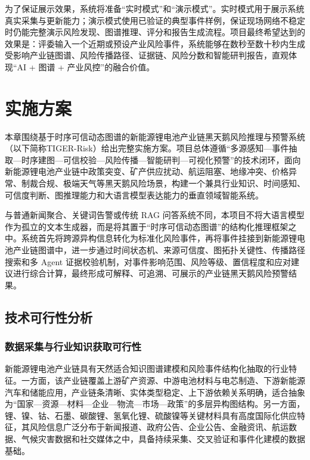 ﻿\documentclass[12pt,a4paper]{article}
\newcommand{\projectname}{基于时序可信动态图谱的新能源锂电池产业链黑天鹅风险推理与预警系统}
\newcommand{\projectshort}{TIGER-Risk}
\begin{document}
为了保证展示效果，系统将准备“实时模式”和“演示模式”。实时模式用于展示系统真实采集与更新能力；演示模式使用已验证的典型事件样例，保证现场网络不稳定时仍能完整演示风险发现、图谱推理、评分和报告生成流程。项目最终希望达到的效果是：评委输入一个近期或预设产业风险事件，系统能够在数秒至数十秒内生成受影响产业链图谱、风险传播路径、证据链、风险分数和智能研判报告，直观体现“AI + 图谱 + 产业风控”的融合价值。


\section{实施方案}

本章围绕\projectname（以下简称\projectshort）给出完整实施方案。项目总体遵循“多源感知—事件抽取—时序建图—可信校验—风险传播—智能研判—可视化预警”的技术闭环，面向新能源锂电池产业链中政策突变、矿产供应扰动、航运阻塞、地缘冲突、价格异常、制裁合规、极端天气等黑天鹅风险场景，构建一个兼具行业知识、时间感知、可信度判断、图推理能力和大语言模型表达能力的垂直领域智能系统。

与普通新闻聚合、关键词告警或传统 RAG 问答系统不同，本项目不将大语言模型作为孤立的文本生成器，而是将其置于“时序可信动态图谱”的结构化推理框架之中。系统首先将跨源异构信息转化为标准化风险事件，再将事件挂接到新能源锂电池产业链图谱中，进一步通过时间状态机、来源可信度、图拓扑关键性、传播路径搜索和多 Agent 证据校验机制，对事件影响范围、风险等级、置信程度和应对建议进行综合计算，最终形成可解释、可追溯、可展示的产业链黑天鹅风险预警结果。

\subsection{技术可行性分析}

\subsubsection{数据采集与行业知识获取可行性}

新能源锂电池产业链具有天然适合知识图谱建模和风险事件结构化抽取的行业特征。一方面，该产业链覆盖上游矿产资源、中游电池材料与电芯制造、下游新能源汽车和储能应用，产业链条清晰、实体类型稳定、上下游依赖关系明确，适合抽象为“国家—资源—材料—企业—物流—市场—政策”的多层异构图结构。另一方面，锂、镍、钴、石墨、碳酸锂、氢氧化锂、硫酸镍等关键材料具有高度国际化供应特征，其风险信息广泛分布于新闻报道、政府公告、企业公告、金融资讯、航运数据、气候灾害数据和社交媒体之中，具备持续采集、交叉验证和事件化建模的数据基础。
\end{document}
